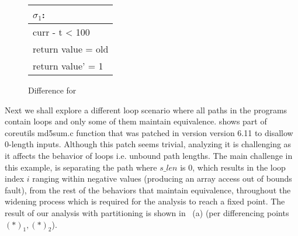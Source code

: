 \begin{figure}
\scriptsize
\centering
\begin{tabular}{l}
$\sigma_1$:
\\ \hline
curr - t < 100
\\
return value = old
\\
return value' = 1
\\ \hline
\end{tabular}
\caption{Difference for }\label{Fi:logicalValue}
\end{figure}


Next we shall explore a different loop scenario where all paths in the programs contain loops and only some of them maintain equivalence.  shows part of coreutils md5sum.c  function that was patched in version version 6.11 to disallow 0-length inputs. Although this patch seems trivial, analyzing it is challenging as it affects the behavior of loops i.e. unbound path lengths. The main challenge in this example, is separating the path where $s\_len$ is 0, which results in the loop index $i$ ranging within negative values (producing an array access out of bounds fault), from the rest of the behaviors that maintain equivalence, throughout the widening process which is required for the analysis to reach a fixed point. The result of our analysis with partitioning is shown in ~(a) (per differencing points $(*)_{1},(*)_{2}$).

